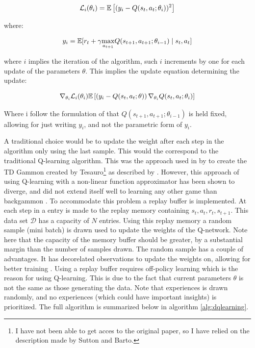 \begin{equation}
    \mathcal{L}_i(\theta_i) = \mathbb{E} \left[ (y_i - Q(s_t, a_t ; \theta_i))^2 \right]
\end{equation}

where:

\begin{equation}
    y_i = \mathbb{E} [r_t + \gamma \underset{a_{t+1}}\max Q(s_{t+1}, a_{t+1}; \theta_{i-1}) \mid s_t, a_t ]
\end{equation}

where $i$ implies the iteration of the algorithm, such $i$ increments by one for each update of the parameters $\theta$. This implies the update equation determining the update:

\begin{equation}
    \nabla_{\theta_i} \mathcal{L}_i (\theta_i)  \mathbb{E} \left[ \left( y_i - Q(s_t, a_t ; \theta) \right) \nabla_{\theta_i} Q(s_t, a_t; \theta_i) \right]
\end{equation}

Where i follow the formulation of \parencite{mnih_playing_nodate} that $Q(s_{t+1}, a_{t+1}; \theta_{i-1})$ is held fixed, allowing for just writing $y_i$, and not the parametric form of $y_i$.

A traditional choice would be to update the weight after each step in the algorithm only using the last sample. This would the correspond to the traditional Q-learning algorithm. This was the approach used in by to create the TD Gammon created by Tesauro\footnote{I have not been able to get acces to the original paper, so I have relied on the description made by Sutton and Barto.} as described by \parencite{sutton_reinforcement_2018}. However, this approach of using Q-learning with a non-linear function approximator has been shown to diverge, and did not extend itself well to learning any other game than backgammon \parencite{tsitsiklis_analysis_1997}. To accommodate this problem a replay buffer is implemented. At each step in a entry is made to the replay memory containing $s_t, a_t, r_t, s_{t+1}$. This data set $\mathcal{D}$ has a capacity of $N$ entries. Using this replay memory a random sample (mini batch) is drawn used to update the weights of the Q-network. Note here that the capacity of the memory buffer should be greater, by a substantial margin than the number of samples drawn. The random sample has a couple of advantages. It has decorelated observations to update the weights on, allowing for better training \parencite{mnih_playing_nodate}. Using a replay buffer requires off-policy learning which is the reason for using Q-learning. This is due to the fact that current parameters $\theta$ is not the same as those generating the data. Note that experiences is drawn randomly, and no experiences (which could have important insights) is prioritized. The full algorithm is summarized below in algorithm \ref{alg:dqlearning}.

